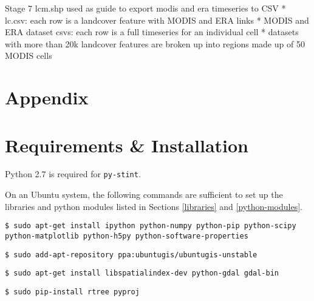\documentclass[twoside,a4paper]{refart}
\begin{document}
      Stage 7
        lcm.shp used as guide to export modis and era timeseries to CSV
        * lc.csv: each row is a landcover feature with MODIS and ERA links
        * MODIS and ERA dataset csvs: each row is a full timeseries for an
          individual cell
        * datasets with more than 20k landcover features are broken up into
          regions made up of 50 MODIS cells


\clearpage
\section*{Appendix}
\appendix
\section{Requirements \& Installation}
\label{setup}

Python 2.7 is required for \texttt{py-stint}.

On an Ubuntu system, the following commands are sufficient to set up the libraries and python modules listed in Sections \ref{libraries} and \ref{python-modules}.

\texttt{\$ sudo apt-get install ipython python-numpy python-pip python-scipy python-matplotlib python-h5py python-software-properties}

\texttt{\$ sudo add-apt-repository ppa:ubuntugis/ubuntugis-unstable}

\texttt{\$ sudo apt-get install libspatialindex-dev python-gdal gdal-bin}

\texttt{\$ sudo pip-install rtree pyproj}
\end{document}
